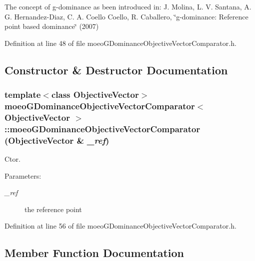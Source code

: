 The concept of g-dominance as been introduced in: J. Molina, L. V. Santana, A. G. Hernandez-Diaz, C. A. Coello Coello, R. Caballero, \char`\"{}g-dominance: Reference point based dominance\char`\"{} (2007) 



Definition at line 48 of file moeo\-GDominance\-Objective\-Vector\-Comparator.h.

\subsection{Constructor \& Destructor Documentation}
\subsubsection{\setlength{\rightskip}{0pt plus 5cm}template$<$class Objective\-Vector$>$ \bf{moeo\-GDominance\-Objective\-Vector\-Comparator}$<$ Objective\-Vector $>$::\bf{moeo\-GDominance\-Objective\-Vector\-Comparator} (Objective\-Vector \& {\em \_\-ref})\hspace{0.3cm}{\tt  [inline]}}\label{classmoeoGDominanceObjectiveVectorComparator_fc4e1f1201b6420d206b28ab98e9ea0d}


Ctor. 

\begin{Desc}
\item[Parameters:]
\begin{description}
\item[{\em \_\-ref}]the reference point \end{description}
\end{Desc}


Definition at line 56 of file moeo\-GDominance\-Objective\-Vector\-Comparator.h.

\subsection{Member Function Documentation}
